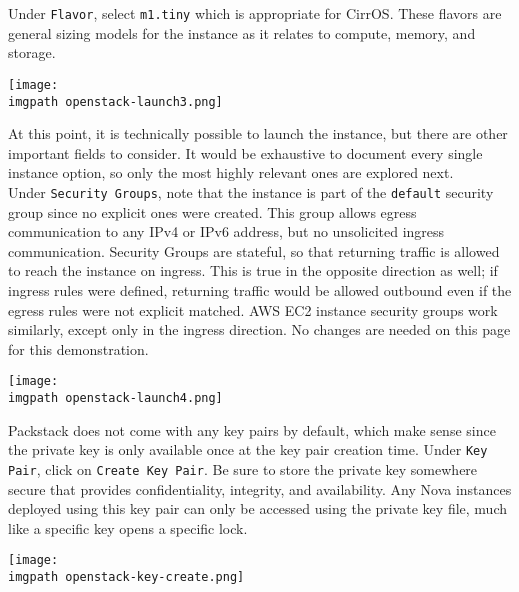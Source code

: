 Under \verb|Flavor|, select \verb|m1.tiny| which is appropriate for CirrOS\@.
These flavors are general sizing models for the instance as it relates to
compute, memory, and storage.

    \begin{minipage}[t]{\linewidth}
	  \centering
      \texttt{[image: \\imgpath openstack-launch3.png]}
    \end{minipage}

At this point, it is technically possible to launch the instance, but there
are other important fields to consider. It would be exhaustive to document
every single instance option, so only the most highly relevant ones are
explored next. \\

Under \verb|Security Groups|, note that the instance is part of the
\verb|default| security group since no explicit ones were created. This group
allows egress communication to any IPv4 or IPv6 address, but no unsolicited
ingress communication. Security Groups are stateful, so that returning traffic
is allowed to reach the instance on ingress. This is true in the opposite
direction as well; if ingress rules were defined, returning traffic would be
allowed outbound even if the egress rules were not explicit matched. AWS EC2
instance security groups work similarly, except only in the ingress direction.
No changes are needed on this page for this demonstration. \\

    \begin{minipage}[t]{\linewidth}
	  \centering
      \texttt{[image: \\imgpath openstack-launch4.png]}
    \end{minipage}

Packstack does not come with any key pairs by default, which make sense since
the private key is only available once at the key pair creation time. Under
\verb|Key Pair|, click on \verb|Create Key Pair|. Be sure to store the private
key somewhere secure that provides confidentiality, integrity, and
availability. Any Nova instances deployed using this key pair can only be
accessed using the private key file, much like a specific key opens a specific
lock.

    \begin{minipage}[t]{\linewidth}
	  \centering
      \texttt{[image: \\imgpath openstack-key-create.png]}
    \end{minipage}

